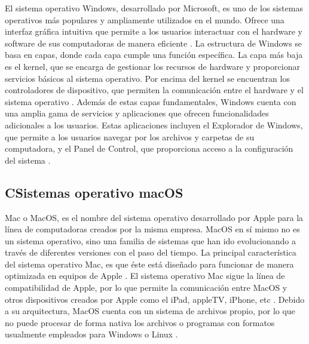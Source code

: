 \begin{list}{}%
    {\setlength{\leftmargin}{1cm}\setlength{\rightmargin}{1cm}}
    \item\relax
    \small

El sistema operativo Windows, desarrollado por Microsoft, es uno de los sistemas operativos más populares y ampliamente utilizados en el mundo. Ofrece una interfaz gráfica intuitiva que permite a los usuarios interactuar con el hardware y software de sus computadoras de manera eficiente \cite{CitaD7}.
La estructura de Windows se basa en capas, donde cada capa cumple una función específica. La capa más baja es el kernel, que se encarga de gestionar los recursos de hardware y proporcionar servicios básicos al sistema operativo. Por encima del kernel se encuentran los controladores de dispositivo, que permiten la comunicación entre el hardware y el sistema operativo \cite{CitaD7}.
Además de estas capas fundamentales, Windows cuenta con una amplia gama de servicios y aplicaciones que ofrecen funcionalidades adicionales a los usuarios. Estas aplicaciones incluyen el Explorador de Windows, que permite a los usuarios navegar por los archivos y carpetas de su computadora, y el Panel de Control, que proporciona acceso a la configuración del sistema \cite{CitaD7}. 

\end{list}


\subsection{CSistemas operativo macOS}

\begin{list}{}%
    {\setlength{\leftmargin}{1cm}\setlength{\rightmargin}{1cm}}
    \item\relax
    \small

Mac o MacOS, es el nombre del sistema operativo desarrollado por Apple para la línea de computadoras creados por la misma empresa. MacOS en sí mismo no es un sistema operativo, sino una familia de sistemas que han ido evolucionando a través de diferentes versiones con el paso del tiempo. La principal característica del sistema operativo Mac, es que éste está diseñado para funcionar de manera optimizada en equipos de Apple \cite{CitaD8}.
El sistema operativo Mac sigue la línea de compatibilidad de Apple, por lo que permite la comunicación entre MacOS y otros dispositivos creados por Apple como el iPad, appleTV, iPhone, etc \cite{CitaD8}.
Debido a su arquitectura, MacOS cuenta con un sistema de archivos propio, por lo que no puede procesar de forma nativa los archivos o programas con formatos usualmente empleados para Windows o Linux \cite{CitaD8}.

\end{list}


